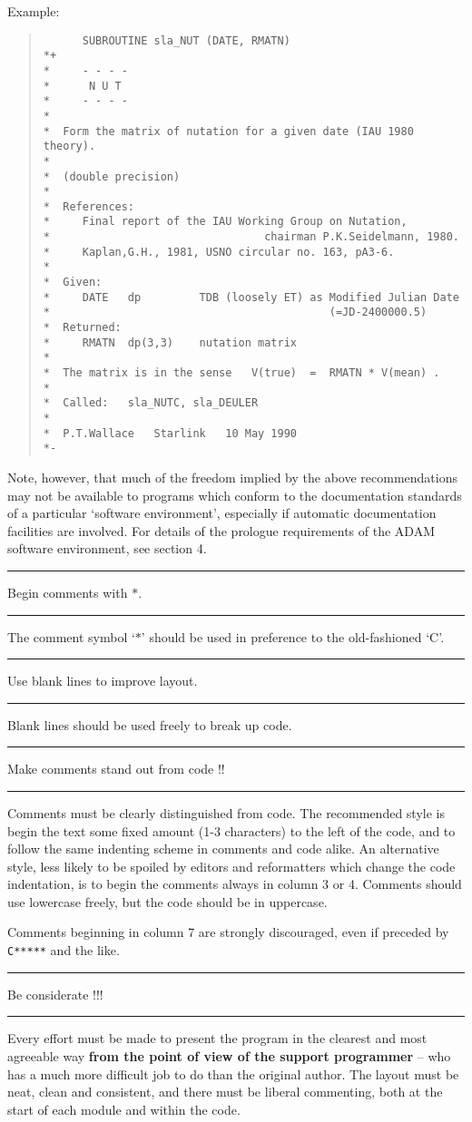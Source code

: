 \documentclass[twoside,11pt]{article}
\newcounter{sruleno}
\newcommand{\srule}[1]{
    \addtocounter{sruleno}{1}
    \goodbreak
    \rule[0.5ex]{\textwidth}{0.3mm}
    {\Large #1 \hfill {\thesruleno}}
    \rule[0.5ex]{\textwidth}{0.1mm}
}
\newcommand{\srule}[1]{
       \addtocounter{sruleno}{1}
       \begin{rawhtml} <HR> \end{rawhtml}
       {\Large \thesruleno}~~~~{\Large #1}
       \begin{rawhtml} <HR> \end{rawhtml}
       \end{tabular}
  }
\renewcommand{\_}{{\tt\char'137}}
\begin{document}
\goodbreak
Example:
\begin{quote}
\begin{footnotesize}
\begin{verbatim}
      SUBROUTINE sla_NUT (DATE, RMATN)
*+
*     - - - -
*      N U T
*     - - - -
*
*  Form the matrix of nutation for a given date (IAU 1980 theory).
*
*  (double precision)
*
*  References:
*     Final report of the IAU Working Group on Nutation,
*                                 chairman P.K.Seidelmann, 1980.
*     Kaplan,G.H., 1981, USNO circular no. 163, pA3-6.
*
*  Given:
*     DATE   dp         TDB (loosely ET) as Modified Julian Date
*                                           (=JD-2400000.5)
*  Returned:
*     RMATN  dp(3,3)    nutation matrix
*
*  The matrix is in the sense   V(true)  =  RMATN * V(mean) .
*
*  Called:   sla_NUTC, sla_DEULER
*
*  P.T.Wallace   Starlink   10 May 1990
*-
\end{verbatim}
\end{footnotesize}
\end{quote}
Note, however, that much of the freedom implied by the above recommendations
may not be available to programs which conform to the documentation standards of
a particular `software environment', especially if automatic documentation
facilities are involved.
For details of the prologue requirements of the ADAM software environment, see
section 4.

\srule{Begin comments with $\ast$.}
The comment symbol `$\ast$' should be used in
preference to the old-fashioned `C'.

\srule{Use blank lines to improve layout.}
Blank lines should be used freely to break up code.

\srule{Make comments stand out from code !!}
Comments must be clearly distinguished from code.  The recommended
style is begin the text some fixed amount (1-3 characters) to the
left of the code, and to follow the same indenting scheme in
comments and code alike.  An alternative style, less likely
to be spoiled by editors and reformatters which change
the code indentation, is to begin the comments always in column
3 or 4.  Comments should use lowercase freely, but the code should
be in uppercase.

Comments beginning in column 7 are strongly discouraged, even if preceded by
\mbox{\tt{C*****}} and the like.
\srule{Be considerate !!!}
Every effort must be made to present the program in the clearest and most
agreeable way {\bf from the point
of view of the support programmer} -- who has a much
more difficult job to do than the original author.
The layout must be neat, clean and consistent, and there must
be liberal commenting, both at the start of each module and
within the code.
\end{document}
